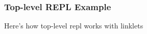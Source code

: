 \subsubsection{Top-level REPL Example}
\label{subsec:toplevel-example}

Here's how top-level repl works with linklets
